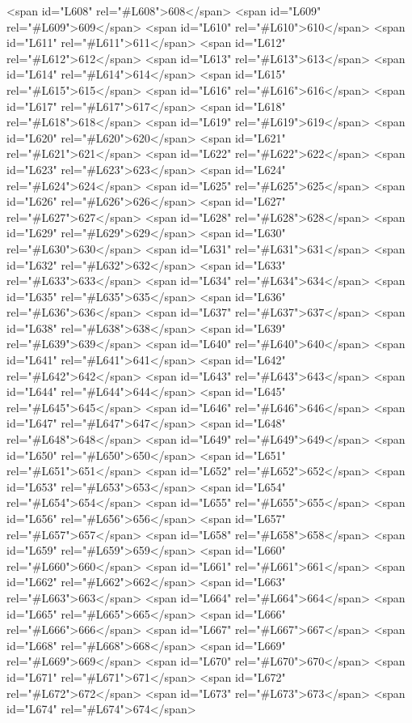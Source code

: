 <span id="L608" rel="#L608">608</span>
<span id="L609" rel="#L609">609</span>
<span id="L610" rel="#L610">610</span>
<span id="L611" rel="#L611">611</span>
<span id="L612" rel="#L612">612</span>
<span id="L613" rel="#L613">613</span>
<span id="L614" rel="#L614">614</span>
<span id="L615" rel="#L615">615</span>
<span id="L616" rel="#L616">616</span>
<span id="L617" rel="#L617">617</span>
<span id="L618" rel="#L618">618</span>
<span id="L619" rel="#L619">619</span>
<span id="L620" rel="#L620">620</span>
<span id="L621" rel="#L621">621</span>
<span id="L622" rel="#L622">622</span>
<span id="L623" rel="#L623">623</span>
<span id="L624" rel="#L624">624</span>
<span id="L625" rel="#L625">625</span>
<span id="L626" rel="#L626">626</span>
<span id="L627" rel="#L627">627</span>
<span id="L628" rel="#L628">628</span>
<span id="L629" rel="#L629">629</span>
<span id="L630" rel="#L630">630</span>
<span id="L631" rel="#L631">631</span>
<span id="L632" rel="#L632">632</span>
<span id="L633" rel="#L633">633</span>
<span id="L634" rel="#L634">634</span>
<span id="L635" rel="#L635">635</span>
<span id="L636" rel="#L636">636</span>
<span id="L637" rel="#L637">637</span>
<span id="L638" rel="#L638">638</span>
<span id="L639" rel="#L639">639</span>
<span id="L640" rel="#L640">640</span>
<span id="L641" rel="#L641">641</span>
<span id="L642" rel="#L642">642</span>
<span id="L643" rel="#L643">643</span>
<span id="L644" rel="#L644">644</span>
<span id="L645" rel="#L645">645</span>
<span id="L646" rel="#L646">646</span>
<span id="L647" rel="#L647">647</span>
<span id="L648" rel="#L648">648</span>
<span id="L649" rel="#L649">649</span>
<span id="L650" rel="#L650">650</span>
<span id="L651" rel="#L651">651</span>
<span id="L652" rel="#L652">652</span>
<span id="L653" rel="#L653">653</span>
<span id="L654" rel="#L654">654</span>
<span id="L655" rel="#L655">655</span>
<span id="L656" rel="#L656">656</span>
<span id="L657" rel="#L657">657</span>
<span id="L658" rel="#L658">658</span>
<span id="L659" rel="#L659">659</span>
<span id="L660" rel="#L660">660</span>
<span id="L661" rel="#L661">661</span>
<span id="L662" rel="#L662">662</span>
<span id="L663" rel="#L663">663</span>
<span id="L664" rel="#L664">664</span>
<span id="L665" rel="#L665">665</span>
<span id="L666" rel="#L666">666</span>
<span id="L667" rel="#L667">667</span>
<span id="L668" rel="#L668">668</span>
<span id="L669" rel="#L669">669</span>
<span id="L670" rel="#L670">670</span>
<span id="L671" rel="#L671">671</span>
<span id="L672" rel="#L672">672</span>
<span id="L673" rel="#L673">673</span>
<span id="L674" rel="#L674">674</span>
